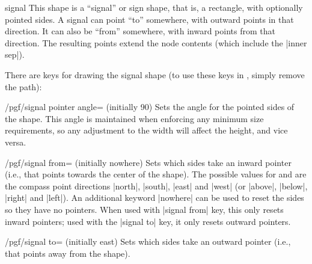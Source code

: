 \begin{shape}{signal}
    This shape is a ``signal'' or sign shape, that is, a rectangle, with
    optionally pointed sides. A signal can point ``to'' somewhere, with outward
    points in that direction. It can also be ``from'' somewhere, with inward
    points from that direction. The resulting points extend the node contents
    (which include the |inner sep|).
\begin{codeexample}[preamble={\usetikzlibrary{shapes.symbols}}]
\end{codeexample}

    There are \pgfname{} keys for drawing the signal shape (to use these keys
    in \tikzname{}, simply remove the  path):

    \begin{key}{/pgf/signal pointer angle= (initially 90)}
        Sets the angle for the pointed sides of the shape. This angle is
        maintained when enforcing any minimum size requirements, so
        any adjustment to the width will affect the height, and vice versa.
    \end{key}

    \begin{key}{/pgf/signal from=\space{} (initially nowhere)}
        Sets which sides take an inward pointer (i.e., that points towards the
        center of the shape). The possible values for  and
         are the compass point directions |north|,
        |south|, |east| and |west| (or |above|, |below|, |right| and |left|).
        An additional keyword |nowhere| can be used to reset the sides so they
        have no pointers. When used with |signal from| key, this only resets
        inward pointers; used with the |signal to| key, it only resets outward
        pointers.
    \end{key}

    \begin{key}{/pgf/signal to=\space{} (initially east)}
        Sets which sides take an outward pointer (i.e., that points away from
        the shape).
    \end{key}


\end{shape}
